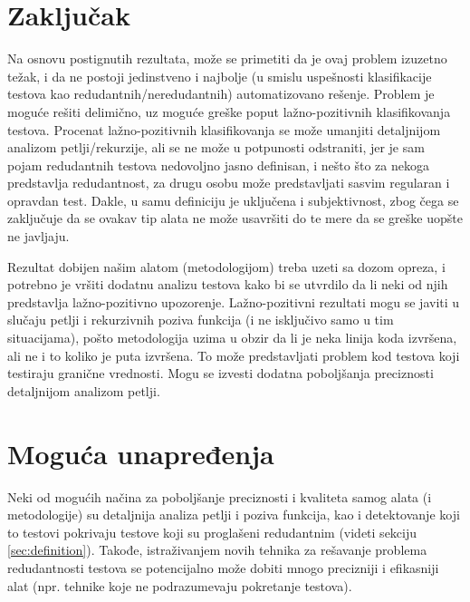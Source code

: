 \documentclass[a4paper]{article}
\begin{document}
\section{Zaključak}
\label{sec:zakljucak}
Na osnovu postignutih rezultata, može se primetiti da je ovaj problem izuzetno težak, i da ne postoji jedinstveno i najbolje (u smislu uspešnosti klasifikacije testova kao redudantnih/neredudantnih) automatizovano rešenje. Problem je moguće rešiti delimično, uz moguće greške poput lažno-pozitivnih klasifikovanja testova. Procenat lažno-pozitivnih klasifikovanja se može umanjiti detaljnijom analizom petlji/rekurzije, ali se ne može u potpunosti odstraniti, jer je sam pojam redudantnih testova nedovoljno jasno definisan, i nešto što za nekoga predstavlja redudantnost, za drugu osobu može predstavljati sasvim regularan i opravdan test. Dakle, u samu definiciju je uključena i subjektivnost, zbog čega se zaključuje da se ovakav tip alata ne može usavršiti do te mere da se greške uopšte ne javljaju.

Rezultat dobijen našim alatom (metodologijom) treba uzeti sa dozom opreza, i potrebno je vršiti dodatnu analizu testova kako bi se utvrdilo da li neki od njih predstavlja lažno-pozitivno upozorenje. Lažno-pozitivni rezultati mogu se javiti u slučaju petlji i rekurzivnih poziva funkcija (i ne isključivo samo u tim situacijama), pošto metodologija uzima u obzir da li je neka linija koda izvršena, ali ne i to koliko je puta izvršena. To može predstavljati problem kod testova koji testiraju granične vrednosti. Mogu se izvesti dodatna poboljšanja preciznosti detaljnijom analizom petlji.

\section{Moguća unapređenja}
\label{sec:unapredjenja}
Neki od mogućih načina za poboljšanje preciznosti i kvaliteta samog alata (i metodologije) su detaljnija analiza petlji i poziva funkcija, kao i detektovanje koji to testovi pokrivaju testove koji su proglašeni redudantnim (videti sekciju \ref{sec:definition}). Takođe, istraživanjem novih tehnika za rešavanje problema redudantnosti testova se potencijalno može dobiti mnogo precizniji i efikasniji alat (npr. tehnike koje ne podrazumevaju pokretanje testova).
\end{document}
